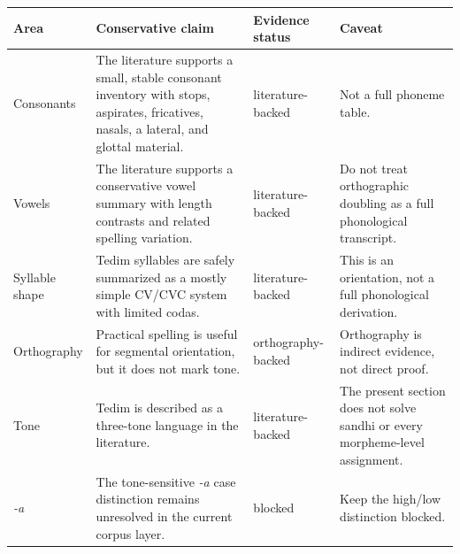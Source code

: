 \documentclass[
  11pt,
  a4paper,
]{article}
\newcounter{none} %
\newcommand{\tdim}[1]{\textit{#1}}
\begin{document}
{\def\LTcaptype{none} %
\begin{longtable}[]{@{}
  >{\raggedright\arraybackslash}p{}
  >{\raggedright\arraybackslash}p{}
  >{\raggedright\arraybackslash}p{}
  >{\raggedright\arraybackslash}p{}@{}}
\toprule\noalign{}
\begin{minipage}[b]{\linewidth}\raggedright
Area
\end{minipage} & \begin{minipage}[b]{\linewidth}\raggedright
Conservative claim
\end{minipage} & \begin{minipage}[b]{\linewidth}\raggedright
Evidence status
\end{minipage} & \begin{minipage}[b]{\linewidth}\raggedright
Caveat
\end{minipage} \\
\midrule\noalign{}
\endhead
\bottomrule\noalign{}
\endlastfoot
Consonants & The literature supports a small, stable consonant inventory
with stops, aspirates, fricatives, nasals, a lateral, and glottal
material. & literature-backed & Not a full phoneme table. \\
Vowels & The literature supports a conservative vowel summary with
length contrasts and related spelling variation. & literature-backed &
Do not treat orthographic doubling as a full phonological transcript. \\
Syllable shape & Tedim syllables are safely summarized as a mostly
simple CV/CVC system with limited codas. & literature-backed & This is
an orientation, not a full phonological derivation. \\
Orthography & Practical spelling is useful for segmental orientation,
but it does not mark tone. & orthography-backed & Orthography is
indirect evidence, not direct proof. \\
Tone & Tedim is described as a three-tone language in the literature. &
literature-backed & The present section does not solve sandhi or every
morpheme-level assignment. \\
\tdim{-a} & The tone-sensitive \tdim{-a} case distinction remains
unresolved in the current corpus layer. & blocked & Keep the high/low
distinction blocked. \\
\end{longtable}
}
\end{document}
